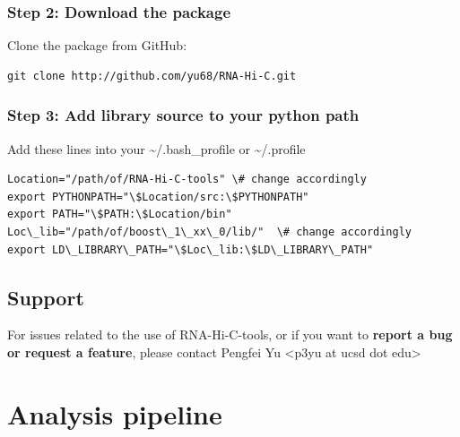 \documentclass[letterpaper,10pt,english]{sphinxmanual}
\begin{document}
\subsection{Step 2: Download the package}
\label{RNA-Hi-C-tools:step-2-download-the-package}
Clone the package from GitHub:

\begin{Verbatim}[commandchars=\\\{\}]
git clone http://github.com/yu68/RNA-Hi-C.git
\end{Verbatim}


\subsection{Step 3: Add library source to your python path}
\label{RNA-Hi-C-tools:step-3-add-library-source-to-your-python-path}
Add these lines into your \textasciitilde{}/.bash\_profile or \textasciitilde{}/.profile

\begin{Verbatim}[commandchars=\\\{\}]
Location="/path/of/RNA-Hi-C-tools" \# change accordingly
export PYTHONPATH="\$Location/src:\$PYTHONPATH"
export PATH="\$PATH:\$Location/bin"
Loc\_lib="/path/of/boost\_1\_xx\_0/lib/"  \# change accordingly
export LD\_LIBRARY\_PATH="\$Loc\_lib:\$LD\_LIBRARY\_PATH"
\end{Verbatim}


\section{Support}
\label{RNA-Hi-C-tools:support}
For issues related to the use of RNA-Hi-C-tools, or if you want to \textbf{report a bug or request a feature}, please contact Pengfei Yu \textless{}p3yu at ucsd dot edu\textgreater{}


\chapter{Analysis pipeline}
\label{Analysis_pipeline:analysis-pipeline}\label{Analysis_pipeline::doc}
\end{document}
